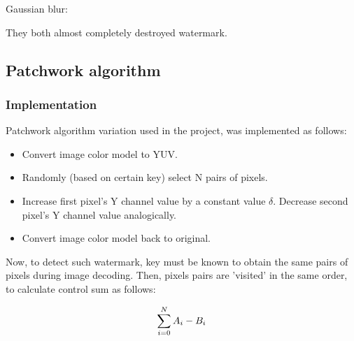 \documentclass[a4paper, 12pt]{article}
\begin{document}
		Gaussian blur:

 		\begin{figure}[!h]%
			\centering
			\qquad
			\label{}%
		\end{figure}


   	They both almost completely destroyed watermark.

	\subsection{Patchwork algorithm}
	
	\subsubsection{Implementation}
	
	Patchwork algorithm variation used in the project, was implemented as follows:
	
	\begin{itemize}
	 \item Convert image color model to YUV.
	 \item Randomly (based on certain key) select N pairs of pixels.
	 \item Increase first pixel's Y channel value by a constant value $\delta$. Decrease second pixel's Y channel value analogically.
	 \item Convert image color model back to original.
	\end{itemize}
	
	Now, to detect such watermark, key must be known to obtain the same pairs of pixels during image decoding. Then, pixels pairs are 'visited' in the same order, to calculate control sum as follows:
	
	\begin{equation}
	 \sum_{i=0}^{N} A_i - B_i \\
	\end{equation}
\end{document}
